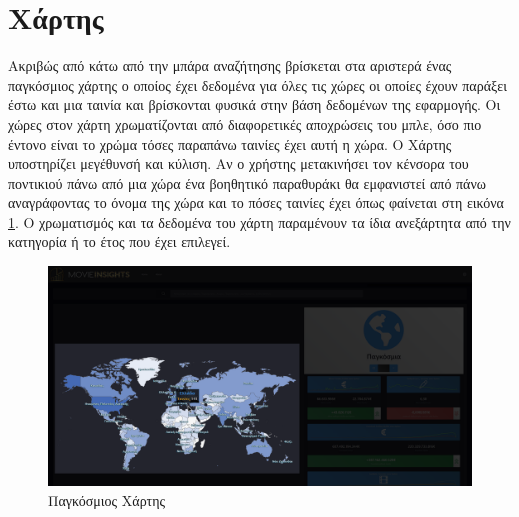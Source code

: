 \section{Χάρτης}
Ακριβώς από κάτω από την μπάρα αναζήτησης βρίσκεται στα αριστερά ένας παγκόσμιος χάρτης ο οποίος έχει δεδομένα για όλες τις χώρες οι οποίες έχουν παράξει έστω και μια ταινία και βρίσκονται φυσικά στην βάση δεδομένων της εφαρμογής.
Οι χώρες στον χάρτη χρωματίζονται από διαφορετικές αποχρώσεις του μπλε, όσο πιο έντονο είναι το χρώμα τόσες παραπάνω ταινίες έχει αυτή η χώρα. Ο Χάρτης υποστηρίζει μεγέθυνσή και κύλιση. Αν ο χρήστης μετακινήσει τον κένσορα του ποντικιού πάνω από μια χώρα ένα βοηθητικό παραθυράκι θα εμφανιστεί από πάνω αναγράφοντας το όνομα της χώρα και το πόσες ταινίες έχει όπως φαίνεται στη εικόνα \ref{demo:map}. Ο χρωματισμός και τα δεδομένα του χάρτη παραμένουν τα ίδια ανεξάρτητα από την κατηγορία ή το έτος που έχει επιλεγεί.

\begin{figure}[H]
  \centering
  \includegraphics[width=145mm]{Chapters/6 - Manual/Images/main_page_map.png}
  \caption{Παγκόσμιος Χάρτης}
  \label{demo:map}
\end{figure}